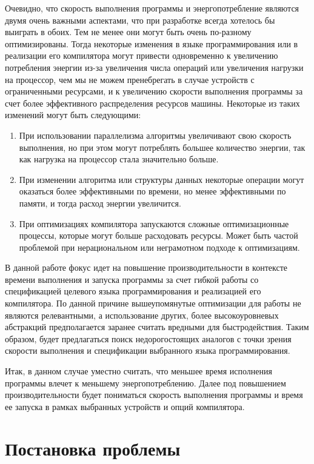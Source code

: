 \documentclass{mipt-thesis-bs}
\begin{document}
Очевидно, что скорость выполнения программы и энергопотребление являются двумя очень важными
аспектами, что при разработке всегда хотелось бы выиграть в обоих. Тем не менее они могут
быть очень по-разному оптимизированы. Тогда некоторые изменения в языке программирования или
в реализации его компилятора могут привести одновременно к увеличению потребления энергии из-за
увеличения числа операций или увеличения нагрузки на процессор, чем мы
не можем пренебрегать в случае устройств с ограниченными ресурсами, и к увеличению скорости выполнения
программы за счет более эффективного распределения ресурсов машины. Некоторые из таких
изменений могут быть следующими:

\begin{enumerate}
    \item При использовании параллелизма алгоритмы увеличивают свою скорость выполнения, но при этом
    могут потреблять большее количество энергии, так как нагрузка на процессор стала
    значительно больше.
    \item При изменении алгоритма или структуры данных некоторые операции могут оказаться
    более эффективными по времени, но менее эффективными по памяти, и тогда расход
    энергии увеличится.
    \item При оптимизациях компилятора запускаются сложные оптимизационные процессы, которые
    могут больше расходовать ресурсы. Может быть частой проблемой при нерациональном или
    неграмотном подходе к оптимизациям.
\end{enumerate}

В данной работе фокус идет на повышение производительности в контексте времени выполнения и
запуска программы за счет гибкой работы со спецификацией целевого языка программирования и
реализацией его компилятора. По данной причине вышеупомянутые оптимизации для работы не являются
релевантными, а использование других, более высокоуровневых абстракций предполагается заранее считать
вредными для быстродействия. Таким образом, будет предлагаться поиск недорогостоящих аналогов
с точки зрения скорости выполнения и спецификации выбранного языка программирования.

Итак, в данном случае уместно считать, что меньшее время исполнения программы
влечет к меньшему энергопотреблению. Далее под повышением производительности будет пониматься скорость выполнения
программы и время ее запуска в рамках выбранных устройств и опций компилятора.



\chapter{Постановка проблемы}
\end{document}
